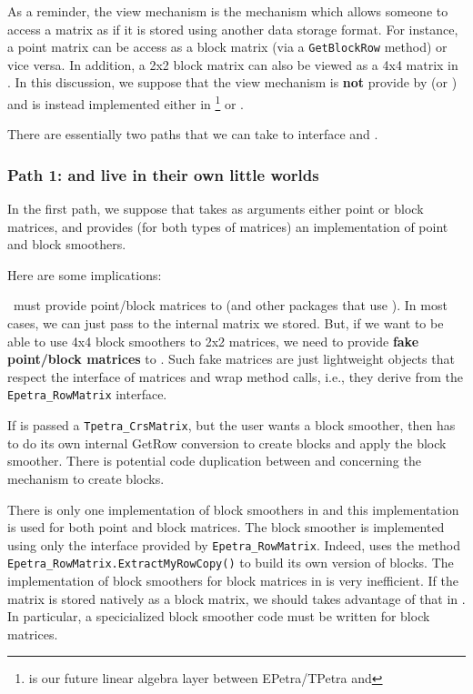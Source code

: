 As a reminder, the view mechanism is the mechanism which allows someone to access a \mulu matrix as if it is stored using another data storage format. For instance, a point matrix can be access as a block matrix (via a \texttt{GetBlockRow} method) or vice versa. In addition, a 2x2 block matrix can also be viewed as a 4x4 matrix in \mulu. In this discussion, we suppose that the view mechanism is \textbf{not} provide by \Tpetra (or \TpetraExt) and is instead implemented either in \cthulhu\footnote{\cthulhu is our future linear algebra layer between EPetra/TPetra and \mulu} or \muelu.

There are essentially two paths that we can take to interface \mulu and \Tifpack.

\subsubsection{Path 1: \Tifpack and \muelu live in their own little worlds}

In the first path, we suppose that \Tifpack takes as arguments either \Tpetra point or block matrices, and provides (for both types of matrices) an implementation of point and block smoothers.

Here are some implications:

\be
\item \mulu\ must provide \Tpetra point/block matrices to \Tifpack (and other packages that use \Tpetra). In most cases, we can just pass to \Tifpack the internal matrix we stored.
  But, if we want to be able to use 4x4 block smoothers to 2x2 matrices, we need to provide \textbf{fake \Tpetra point/block matrices} to \Tifpack.
  Such fake matrices are just lightweight objects that respect the interface of \Epetra matrices and wrap method calls, i.e.,
  they derive from the {\tt Epetra\_RowMatrix} interface.

\item If \Tifpack is passed a {\tt Tpetra\_CrsMatrix}, but the user wants a block smoother, then \Tifpack has to do its own internal GetRow conversion to create blocks and apply the block smoother. There is potential code duplication between \mulu and \Tifpack concerning the mechanism to create blocks.

\item There is only one implementation of block smoothers in \Ifpack and this implementation is used for both point and block matrices. 
The block smoother is implemented using only the interface provided by \texttt{Epetra\_RowMatrix}. Indeed, \Ifpack uses the method \texttt{Epetra\_RowMatrix.ExtractMyRowCopy()} to build its own version of blocks.
The implementation of block smoothers for block matrices in \Ifpack is very inefficient. If the matrix is stored natively as a block matrix,
we should takes advantage of that in \Tifpack. In particular, a specicialized block smoother code must be written for block matrices.

